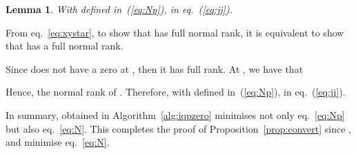\documentclass[twocolumn,12pt]{autart}
\theoremstyle{plain}
\newtheorem{lemma}{Lemma}
\newenvironment{proof}[1][Proof]{\begin{trivlist} \item[\hskip \labelsep {\bfseries #1}]}{\end{trivlist}}
\begin{document}
\begin{lemma}
With  defined in~(\ref{eq:Np}),  in eq.~(\ref{eq:jj}).
\end{lemma}
\begin{proof}
From eq.~\eqref{eq:xystar}, to show that  has full normal rank, it is equivalent to show that 
 has a full normal rank. 

Since  does not have a zero at , then it has full rank. At , we have that

Hence, the normal rank of . Therefore, with  defined in~(\ref{eq:Np}),  in eq.~(\ref{eq:jj}).
\end{proof}


In summary,  obtained in Algorithm~\ref{alg:iqpzero} minimises not only eq.~\eqref{eq:Np} but also eq.~\eqref{eq:N}. This completes the proof of Proposition~\ref{prop:convert} since  ,  and  minimise eq.~\eqref{eq:N}.
\end{document}

